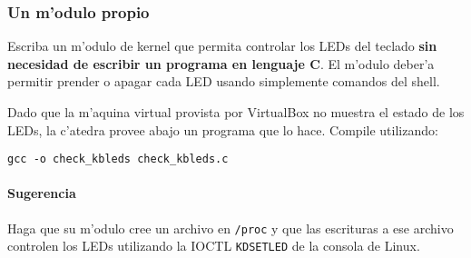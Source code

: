 \subsubsection{Un m'odulo propio}

Escriba un m'odulo de kernel que permita controlar los LEDs del teclado \textbf{sin necesidad de escribir un programa
en lenguaje C}. El m'odulo deber'a permitir prender o apagar cada LED usando simplemente comandos del shell.

Dado que la m'aquina virtual provista por VirtualBox no muestra el estado de los LEDs, la c'atedra provee abajo
un programa que lo hace. Compile utilizando:

\texttt{gcc -o check\_kbleds check\_kbleds.c}


\paragraph{Sugerencia}

Haga que su m'odulo cree un archivo en \texttt{/proc} y que las escrituras a ese archivo controlen los LEDs utilizando
la IOCTL \texttt{KDSETLED} de la consola de Linux.
